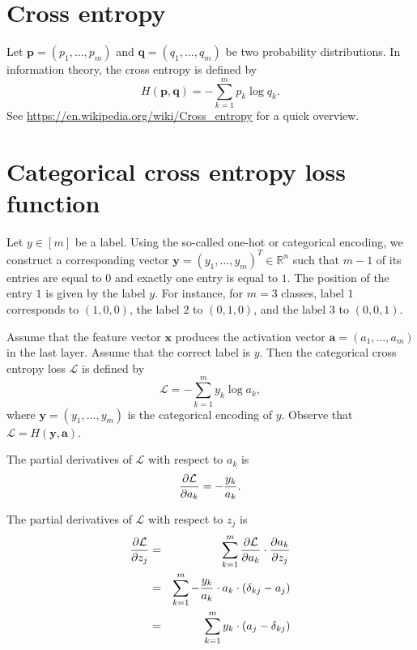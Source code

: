 \documentclass[12pt]{article}
\newcommand{\R}{\mathbb{R}}
\newcommand{\x}{\boldsymbol{x}}
\newcommand{\y}{\boldsymbol{y}}
\begin{document}
\section{Cross entropy}

Let $\boldsymbol{p}=(p_1,\ldots,p_m)$ and $\boldsymbol{q}=(q_1,\ldots,q_m)$ be two probability distributions. In information theory, the cross entropy is defined by
\begin{equation}
H(\boldsymbol{p},\boldsymbol{q}) = - \sum_{k=1}^m p_k \log q_k.
\end{equation}
See \url{https://en.wikipedia.org/wiki/Cross_entropy} for a quick overview.

\section{Categorical cross entropy loss function}

Let $y\in[m]$ be a label. Using the so-called one-hot or categorical encoding, we construct a corresponding vector $\boldsymbol{y}=(y_1,\ldots,y_m)^T\in\R^n$ such that $m-1$ of its entries are equal to $0$ and exactly one entry is equal to $1$. The position of the entry $1$ is given by the label $y$. For instance, for $m=3$ classes, label $1$ corresponds to $(1,0,0)$, the label $2$ to $(0,1,0)$, and the label $3$ to $(0,0,1)$.

Assume that the feature vector $\x$ produces the activation vector $\boldsymbol{a}=(a_1,\ldots,a_m)$ in the last layer. Assume that the correct label is $y$. Then the categorical cross entropy loss $\mathcal{L}$ is defined by
\begin{equation}
\mathcal{L} = -\sum_{k=1}^m y_k \log a_k,
\end{equation}
where $\y=(y_1,\ldots,y_m)$ is the categorical encoding of $y$. Observe that $\mathcal{L}=H(\y,\boldsymbol{a})$.

The partial derivatives of $\mathcal{L}$ with respect to $a_k$ is
\begin{equation}
{\partial \mathcal{L} \over \partial a_k} = -\frac{y_k}{a_k}.
\end{equation}

The partial derivatives of $\mathcal{L}$ with respect to $z_j$ is
\begin{eqnarray}
{\partial \mathcal{L} \over \partial z_j} 
& = &
\sum_{k=1}^m {\partial \mathcal{L} \over \partial a_k} \cdot {\partial a_k \over \partial z_j} \\
& = &
\sum_{k=1}^m -\frac{y_k}{a_k} \cdot a_k \cdot (\delta_{kj} - a_j)  \\
& = &
\sum_{k=1}^m y_k \cdot (a_j - \delta_{kj})
\end{eqnarray}
\end{document}
